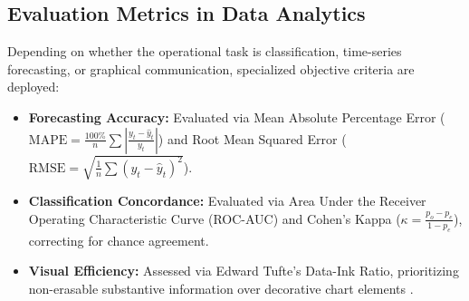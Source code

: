\subsection{Evaluation Metrics in Data Analytics}
Depending on whether the operational task is classification, time-series forecasting, or graphical communication, specialized objective criteria are deployed:
\begin{itemize}
  \item \textbf{Forecasting Accuracy:} Evaluated via Mean Absolute Percentage Error ($\text{MAPE} = \frac{100\%}{n} \sum \left| \frac{y_t - \hat{y}_t}{y_t} \right|$) and Root Mean Squared Error ($\text{RMSE} = \sqrt{\frac{1}{n} \sum (y_t - \hat{y}_t)^2}$).
  \item \textbf{Classification Concordance:} Evaluated via Area Under the Receiver Operating Characteristic Curve (ROC-AUC) and Cohen's Kappa ($\kappa = \frac{p_o - p_e}{1 - p_e}$), correcting for chance agreement.
  \item \textbf{Visual Efficiency:} Assessed via Edward Tufte's Data-Ink Ratio, prioritizing non-erasable substantive information over decorative chart elements \cite{tufte2001visual}.
\end{itemize}
